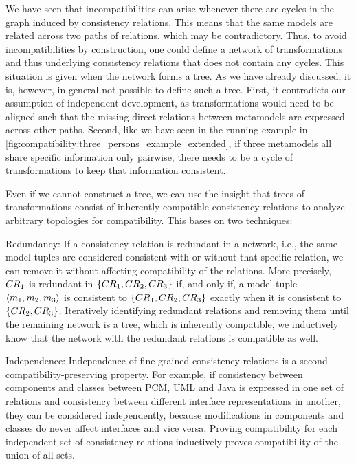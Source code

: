 We have seen that incompatibilities can arise whenever there are cycles in the graph induced by consistency relations.
This means that the same models are related across two paths of relations, which may be contradictory.
Thus, to avoid incompatibilities by construction, one could define a network of transformations and thus underlying consistency relations that does not contain any cycles.
This situation is given when the network forms a tree.
As we have already discussed, it is, however, in general not possible to define such a tree.
First, it contradicts our assumption of independent development, as transformations would need to be aligned such that the missing direct relations between metamodels are expressed across other paths.
Second, like we have seen in the running example in \autoref{fig:compatibility:three_persons_example_extended}, if three metamodels all share specific information only pairwise, there needs to be a cycle of transformations to keep that information consistent.

Even if we cannot construct a tree, we can use the insight that trees of transformations consist of inherently compatible consistency relations to analyze arbitrary topologies for compatibility.
This bases on two techniques:
\begin{properdescription}
    \item[Redundancy:] If a consistency relation is redundant in a network, i.e., the same model tuples are considered consistent with or without that specific relation, we can remove it without affecting compatibility of the relations. More precisely, $\consistencyrelation{CR}{1}$ is redundant in $\setted{\consistencyrelation{CR}{1}, \consistencyrelation{CR}{2}, \consistencyrelation{CR}{3}}$ if, and only if, a model tuple $\tupled{\model{m}{1}, \model{m}{2}, \model{m}{3}}$ is consistent to $\setted{\consistencyrelation{CR}{1}, \consistencyrelation{CR}{2}, \consistencyrelation{CR}{3}}$ exactly when it is consistent to $\setted{\consistencyrelation{CR}{2}, \consistencyrelation{CR}{3}}$.
    Iteratively identifying redundant relations and removing them until the remaining network is a tree, which is inherently compatible, we inductively know that the network with the redundant relations is compatible as well.
    \item[Independence:] Independence of fine-grained consistency relations is a second compatibility-preserving property.
    For example, if consistency between components and classes between \gls{PCM}, UML and Java is expressed in one set of relations and consistency between different interface representations in another, they can be considered independently, because modifications in components and classes do never affect interfaces and vice versa.
    Proving compatibility for each independent set of consistency relations inductively proves compatibility of the union of all sets.
\end{properdescription}

